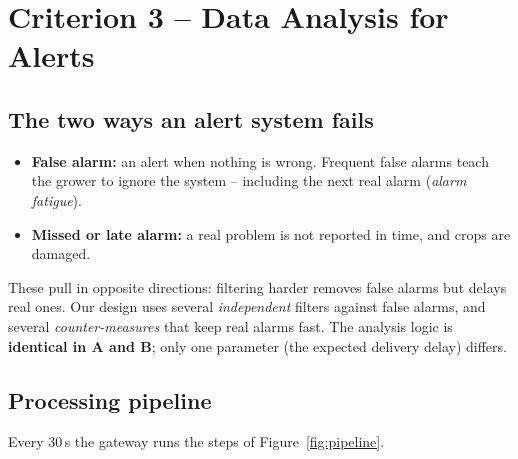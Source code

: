 \documentclass[11pt,a4paper]{report}
\begin{document}
\chapter{Criterion 3 -- Data Analysis for Alerts}\label{ch:alert}

\section{The two ways an alert system fails}
\begin{itemize}[noitemsep]
  \item \textbf{False alarm:} an alert when nothing is wrong. Frequent false alarms teach the grower to ignore the system -- including the next real alarm (\emph{alarm fatigue}).
  \item \textbf{Missed or late alarm:} a real problem is not reported in time, and crops are damaged.
\end{itemize}
These pull in opposite directions: filtering harder removes false alarms but delays real ones. Our design uses several \emph{independent} filters against false alarms, and several \emph{counter-measures} that keep real alarms fast. The analysis logic is \textbf{identical in A and B}; only one parameter (the expected delivery delay) differs.

\section{Processing pipeline}
Every 30\,s the gateway runs the steps of Figure~\ref{fig:pipeline}.
\end{document}
